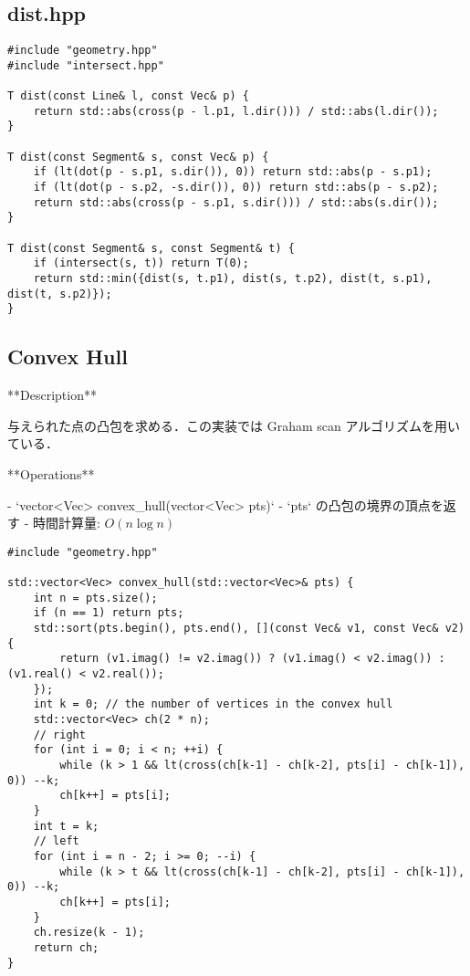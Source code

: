 \subsection{dist.hpp}

\begin{small}
\begin{markdown}

\end{markdown}
\end{small}

\begin{lstlisting}
#include "geometry.hpp"
#include "intersect.hpp"

T dist(const Line& l, const Vec& p) {
    return std::abs(cross(p - l.p1, l.dir())) / std::abs(l.dir());
}

T dist(const Segment& s, const Vec& p) {
    if (lt(dot(p - s.p1, s.dir()), 0)) return std::abs(p - s.p1);
    if (lt(dot(p - s.p2, -s.dir()), 0)) return std::abs(p - s.p2);
    return std::abs(cross(p - s.p1, s.dir())) / std::abs(s.dir());
}

T dist(const Segment& s, const Segment& t) {
    if (intersect(s, t)) return T(0);
    return std::min({dist(s, t.p1), dist(s, t.p2), dist(t, s.p1), dist(t, s.p2)});
}

\end{lstlisting}

\subsection{Convex Hull}

\begin{small}
\begin{markdown}
**Description**

与えられた点の凸包を求める．この実装では Graham scan アルゴリズムを用いている．

**Operations**

- `vector<Vec> convex\_hull(vector<Vec> pts)`
    - `pts` の凸包の境界の頂点を返す
    - 時間計算量: $O(n\log n)$
\end{markdown}
\end{small}

\begin{lstlisting}
#include "geometry.hpp"

std::vector<Vec> convex_hull(std::vector<Vec>& pts) {
    int n = pts.size();
    if (n == 1) return pts;
    std::sort(pts.begin(), pts.end(), [](const Vec& v1, const Vec& v2) {
        return (v1.imag() != v2.imag()) ? (v1.imag() < v2.imag()) : (v1.real() < v2.real());
    });
    int k = 0; // the number of vertices in the convex hull
    std::vector<Vec> ch(2 * n);
    // right
    for (int i = 0; i < n; ++i) {
        while (k > 1 && lt(cross(ch[k-1] - ch[k-2], pts[i] - ch[k-1]), 0)) --k;
        ch[k++] = pts[i];
    }
    int t = k;
    // left
    for (int i = n - 2; i >= 0; --i) {
        while (k > t && lt(cross(ch[k-1] - ch[k-2], pts[i] - ch[k-1]), 0)) --k;
        ch[k++] = pts[i];
    }
    ch.resize(k - 1);
    return ch;
}

\end{lstlisting}


